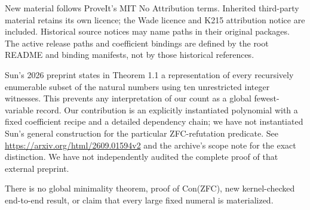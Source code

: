 \documentclass[
  10pt,
]{article}
\begin{document}
New material follows ProveIt's MIT No Attribution terms. Inherited
third-party material retains its own licence; the Wade licence and K215
attribution notice are included. Historical source notices may name
paths in their original packages. The active release paths and
coefficient bindings are defined by the root README and binding
manifests, not by those historical references.

Sun's 2026 preprint states in Theorem 1.1 a representation of every
recursively enumerable subset of the natural numbers using ten
unrestricted integer witnesses. This prevents any interpretation of our
count as a global fewest-variable record. Our contribution is an
explicitly instantiated polynomial with a fixed coefficient recipe and a
detailed dependency chain; we have not instantiated Sun's general
construction for the particular ZFC-refutation predicate. See
\url{https://arxiv.org/html/2609.01594v2} and the archive's scope note
for the exact distinction. We have not independently audited the
complete proof of that external preprint.

There is no global minimality theorem, proof of Con(ZFC), new
kernel-checked end-to-end result, or claim that every large fixed
numeral is materialized.
\end{document}
